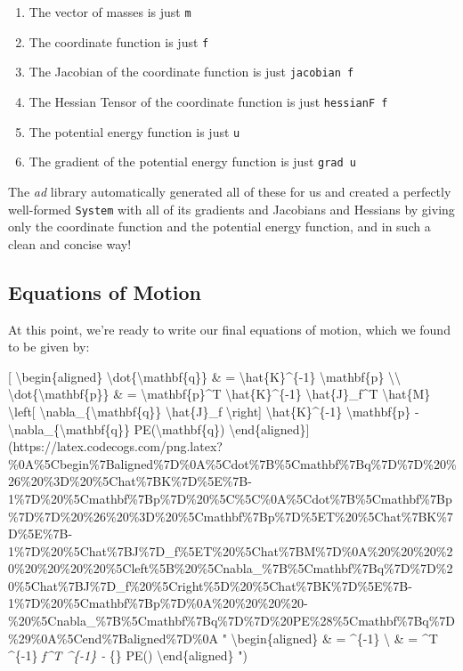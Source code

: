 \documentclass[]{article}
\begin{document}
\begin{enumerate}
\def\labelenumi{\arabic{enumi}.}
\tightlist
\item
  The vector of masses is just \texttt{m}
\item
  The coordinate function is just \texttt{f}
\item
  The Jacobian of the coordinate function is just \texttt{jacobian\ f}
\item
  The Hessian Tensor of the coordinate function is just \texttt{hessianF\ f}
\item
  The potential energy function is just \texttt{u}
\item
  The gradient of the potential energy function is just \texttt{grad\ u}
\end{enumerate}

The \emph{ad} library automatically generated all of these for us and created a
perfectly well-formed \texttt{System} with all of its gradients and Jacobians
and Hessians by giving only the coordinate function and the potential energy
function, and in such a clean and concise way!

\hypertarget{equations-of-motion}{%
\subsection{Equations of Motion}\label{equations-of-motion}}

At this point, we're ready to write our final equations of motion, which we
found to be given by:

{[} \textbackslash{}begin\{aligned\}
\textbackslash{}dot\{\textbackslash{}mathbf\{q\}\} \& =
\textbackslash{}hat\{K\}\^{}\{-1\} \textbackslash{}mathbf\{p\}
\textbackslash{}\textbackslash{}
\textbackslash{}dot\{\textbackslash{}mathbf\{p\}\} \& =
\textbackslash{}mathbf\{p\}\^{}T \textbackslash{}hat\{K\}\^{}\{-1\}
\textbackslash{}hat\{J\}\_f\^{}T \textbackslash{}hat\{M\}
\textbackslash{}left{[} \textbackslash{}nabla\_\{\textbackslash{}mathbf\{q\}\}
\textbackslash{}hat\{J\}\_f \textbackslash{}right{]}
\textbackslash{}hat\{K\}\^{}\{-1\} \textbackslash{}mathbf\{p\} -
\textbackslash{}nabla\_\{\textbackslash{}mathbf\{q\}\}
PE(\textbackslash{}mathbf\{q\})
\textbackslash{}end\{aligned\}{]}(https://latex.codecogs.com/png.latex?\%0A\%5Cbegin\%7Baligned\%7D\%0A\%5Cdot\%7B\%5Cmathbf\%7Bq\%7D\%7D\%20\%26\%20\%3D\%20\%5Chat\%7BK\%7D\%5E\%7B-1\%7D\%20\%5Cmathbf\%7Bp\%7D\%20\%5C\%5C\%0A\%5Cdot\%7B\%5Cmathbf\%7Bp\%7D\%7D\%20\%26\%20\%3D\%20\%5Cmathbf\%7Bp\%7D\%5ET\%20\%5Chat\%7BK\%7D\%5E\%7B-1\%7D\%20\%5Chat\%7BJ\%7D\_f\%5ET\%20\%5Chat\%7BM\%7D\%0A\%20\%20\%20\%20\%20\%20\%20\%20\%5Cleft\%5B\%20\%5Cnabla\_\%7B\%5Cmathbf\%7Bq\%7D\%7D\%20\%5Chat\%7BJ\%7D\_f\%20\%5Cright\%5D\%20\%5Chat\%7BK\%7D\%5E\%7B-1\%7D\%20\%5Cmathbf\%7Bp\%7D\%0A\%20\%20\%20\%20-\%20\%5Cnabla\_\%7B\%5Cmathbf\%7Bq\%7D\%7D\%20PE\%28\%5Cmathbf\%7Bq\%7D\%29\%0A\%5Cend\%7Baligned\%7D\%0A
" \textbackslash{}begin\{aligned\}  \& = \^{}\{-1\}
 \textbackslash{}  \& = \^{}T
\^{}\{-1\} \emph{f\^{}T 
 \^{}\{-1\}  -
\nabla}\{\} PE() \textbackslash{}end\{aligned\} ")
\end{document}
